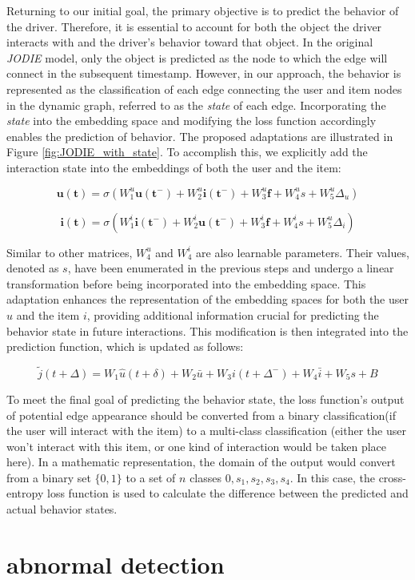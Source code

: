 Returning to our initial goal, the primary objective is to predict the behavior of the driver. Therefore, it is essential to account for both the object the driver interacts with and the driver’s behavior toward that object. In the original \textit{JODIE} model, only the object is predicted as the node to which the edge will connect in the subsequent timestamp. However, in our approach, the behavior is represented as the classification of each edge connecting the user and item nodes in the dynamic graph, referred to as the \textit{state} of each edge. Incorporating the \textit{state} into the embedding space and modifying the loss function accordingly enables the prediction of behavior. The proposed adaptations are illustrated in Figure \ref{fig:JODIE_with_state}. To accomplish this, we explicitly add the interaction state into the embeddings of both the user and the item: 


\[ \mathbf{u(t)} = \sigma (W_1^u \mathbf{u(t^-)} + W_2^u \mathbf{i(t^-)} + W_3^u \mathbf{f} + W^u_4s+W^u_5\Delta _u) \]

\[ \mathbf{i(t)} = \sigma (W_1^i \mathbf{i(t^-)} + W_2^i \mathbf{u(t^-)} + W_3^i \mathbf{f} + W^i_4s+W^u_5 \Delta _i) \]


Similar to other matrices, $W^u_4$ and $W^i_4$ are also learnable parameters. Their values, denoted as $s$, have been enumerated in the previous steps and undergo a linear transformation before being incorporated into the embedding space. This adaptation enhances the representation of the embedding spaces for both the user $u$ and the item $i$, providing additional information crucial for predicting the behavior state in future interactions. This modification is then integrated into the prediction function, which is updated as follows:

$$\tilde{j}(t+\Delta)=W_1\hat{u}(t+\delta)+W_2\bar{u}+W_3i(t+\Delta ^-)+W_4\bar{i}+W_5s+B$$

To meet the final goal of predicting the behavior state, the loss function's output  of potential edge appearance should be converted from a binary classification(if the user will interact with the item) to a multi-class classification (either the user won't interact with this item, or one kind of interaction would be taken place here). In a mathematic representation, the domain of the output would convert from a binary set $\{0,1\}$ to a set of $n$ classes ${0,s_1,s_2,s_3,s_4}$. In this case, the cross-entropy loss function is used to calculate the difference between the predicted and actual behavior states. 






\section{abnormal detection}